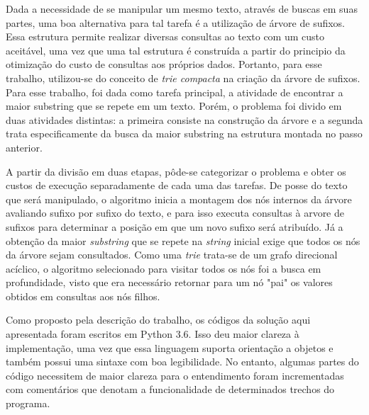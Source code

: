 Dada a necessidade de se manipular um mesmo texto, através de buscas em suas
partes, uma boa alternativa para tal tarefa é a utilização de árvore de sufixos.
Essa estrutura permite realizar diversas consultas ao texto com um custo
aceitável, uma vez que uma tal estrutura é construída a partir do principio da
otimização do custo de consultas aos próprios dados.
Portanto, para esse trabalho, utilizou-se do conceito de \textit{trie compacta}
na criação da árvore de sufixos.
Para esse trabalho, foi dada como tarefa principal, a atividade de encontrar a
maior substring que se repete em um texto.
Porém, o problema foi divido em duas atividades distintas: a primeira consiste
na construção da árvore e a segunda trata especificamente da busca da maior
substring na estrutura montada no passo anterior.

A partir da divisão em duas etapas, pôde-se categorizar o problema e obter os
custos de execução separadamente de cada uma das tarefas.
De posse do texto que será manipulado, o algoritmo inicia a montagem dos nós
internos da árvore avaliando sufixo por sufixo do texto, e para isso executa
consultas à arvore de sufixos para determinar a posição em que um novo sufixo
será atribuído.
Já a obtenção da maior \textit{substring} que se repete na \textit{string}
inicial exige que todos os nós da árvore sejam consultados.
Como uma \textit{trie} trata-se de um grafo direcional acíclico, o algoritmo
selecionado para visitar todos os nós foi a busca em profundidade, visto que
era necessário retornar para um nó "pai" os valores obtidos em consultas aos
nós filhos.

Como proposto pela descrição do trabalho, os códigos da solução aqui apresentada
foram escritos em Python 3.6.
Isso deu maior clareza à implementação, uma vez que essa linguagem suporta
orientação a objetos e também possui uma sintaxe com boa legibilidade.
No entanto, algumas partes do código necessitem de maior clareza para o entendimento
foram incrementadas com comentários que denotam a funcionalidade de determinados
trechos do programa.